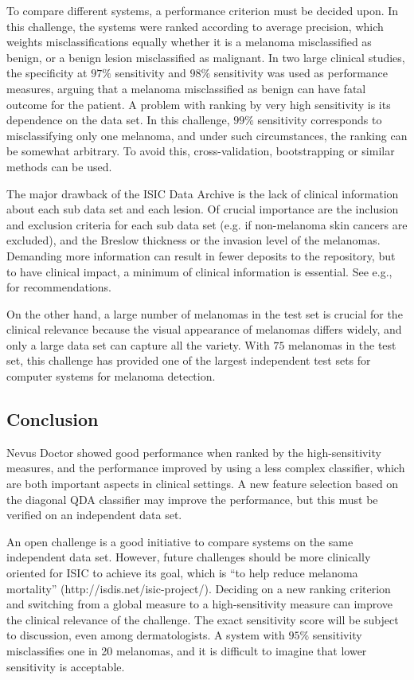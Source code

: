 \documentclass[a4paper,12pt]{article}
\begin{document}
To compare different systems, a performance criterion must be decided upon. In this challenge, the systems were ranked according to average precision, which weights misclassifications equally whether it is a melanoma misclassified as benign, or a benign lesion misclassified as malignant. In two large clinical studies, the specificity at $97\%$ sensitivity \citep{Malvehy2014Clinical} and $98\%$ sensitivity \citep{Monheit2011Performance} was used as performance measures, arguing that a melanoma misclassified as benign can have fatal outcome for the patient. A problem with ranking by very high sensitivity is its dependence on the data set. In this challenge, $99\%$ sensitivity corresponds to misclassifying only one melanoma, and under such circumstances, the ranking can be somewhat arbitrary. To avoid this, cross-validation, bootstrapping or similar methods can be used.   

The major drawback of the ISIC Data Archive is the lack of clinical information about each sub data set and each lesion. Of crucial importance are the inclusion and exclusion criteria for each sub data set (e.g. if non-melanoma skin cancers are excluded), and the Breslow thickness or the invasion level of the melanomas. Demanding more information can result in fewer deposits to the repository, but to have clinical impact, a minimum of clinical information is essential. See e.g., \citep{Malvehy2007Dermoscopy} for recommendations. 

On the other hand, a large number of melanomas in the test set is crucial for the clinical relevance because the visual appearance of melanomas differs widely, and only a large data set can capture all the variety. With $75$ melanomas in the test set, this challenge has provided one of the largest independent test sets for computer systems for melanoma detection.  

\subsection{Conclusion}

Nevus Doctor showed good performance when ranked by the high-sensitivity measures, and the performance improved by using a less complex classifier, which are both important aspects in clinical settings. A new feature selection based on the diagonal QDA classifier may improve the performance, but this must be verified on an independent data set. 

An open challenge is a good initiative to compare systems on the same independent data set. However, future challenges should be more clinically oriented for ISIC to achieve its goal, which is ``to help reduce melanoma mortality'' (http://isdis.net/isic-project/). Deciding on a new ranking criterion and switching from a global measure to a high-sensitivity measure can improve the clinical relevance of the challenge. The exact sensitivity score will be subject to discussion, even among dermatologists. A system with $95\%$ sensitivity misclassifies one in 20 melanomas, and it is difficult to imagine that lower sensitivity is acceptable. 
\end{document}

